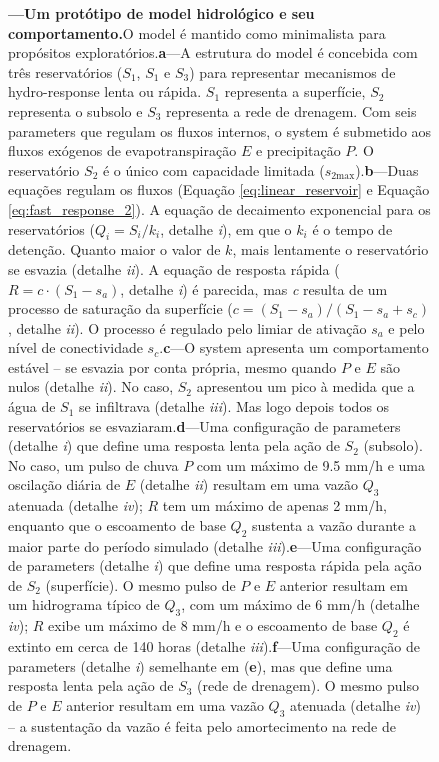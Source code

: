 \documentclass[./main.tex]{subfiles}
\begin{document}
\begin{figure}[t!]
	{\textbf{---\;Um protótipo de \gls{model} hidrológico e seu comportamento.}\;O \gls{model} é mantido como minimalista para propósitos exploratórios.\;\textbf{a}\;---\;A estrutura do \gls{model} é concebida com três reservatórios ($S_1$, $S_1$ e $S_3$) para representar mecanismos de \gls{hydro-response} lenta ou rápida. $S_1$ representa a superfície, $S_2$ representa o subsolo e $S_3$ representa a rede de drenagem. Com seis \gls{parameters} que regulam os fluxos internos, o \gls{system} é submetido aos fluxos exógenos de evapotranspiração $E$ e precipitação $P$. O reservatório $S_2$ é o único com capacidade limitada ($s_\text{2max}$).\;\textbf{b}\;---\;Duas equações regulam os fluxos (Equação \eqref{eq:linear_reservoir} e Equação \eqref{eq:fast_response_2}). A equação de decaimento exponencial para os reservatórios ($Q_i = S_i/k_i$, detalhe \textrm{\textit{i}}), em que o $k_i$ é o tempo de detenção. Quanto maior o valor de $k$, mais lentamente o reservatório se esvazia (detalhe \textrm{\textit{ii}}). A equação de resposta rápida ($R = c\cdot (S_1 - s_a)$, detalhe \textrm{\textit{i}}) é parecida, mas \textit{c} resulta de um processo de saturação da superfície ($c = (S_1 - s_a)/(S_1 - s_a + s_c)$, detalhe \textrm{\textit{ii}}). O processo é regulado pelo limiar de ativação $s_a$ e pelo nível de conectividade $s_c$.\;\textbf{c}\;---\;O \gls{system} apresenta um comportamento estável -- se esvazia por conta própria, mesmo quando $P$ e $E$ são nulos (detalhe \textrm{\textit{ii}}). No caso, $S_2$ apresentou um pico à medida que a água de $S_1$ se infiltrava (detalhe \textrm{\textit{iii}}). Mas logo depois todos os reservatórios se esvaziaram.\;\textbf{d}\;---\;Uma configuração de \gls{parameters} (detalhe \textrm{\textit{i}}) que define uma resposta lenta pela ação de $S_2$ (subsolo). No caso, um pulso de chuva $P$ com um máximo de 9.5 mm/h e uma oscilação diária de $E$ (detalhe \textrm{\textit{ii}}) resultam em uma vazão $Q_3$ atenuada (detalhe \textrm{\textit{iv}}); $R$ tem um máximo de apenas 2 mm/h, enquanto que o escoamento de base $Q_2$ sustenta a vazão durante a maior parte do período simulado (detalhe \textrm{\textit{iii}}).\;\textbf{e}\;---\;Uma configuração de \gls{parameters} (detalhe \textrm{\textit{i}}) que define uma resposta rápida pela ação de $S_2$ (superfície). O mesmo pulso de $P$ e $E$ anterior resultam em um hidrograma típico de $Q_3$, com um máximo de 6 mm/h (detalhe \textrm{\textit{iv}}); $R$ exibe um máximo de 8 mm/h e o escoamento de base $Q_2$ é extinto em cerca de 140 horas (detalhe \textrm{\textit{iii}}).\;\textbf{f}\;---\;Uma configuração de \gls{parameters} (detalhe \textrm{\textit{i}}) semelhante em (\textbf{e}), mas que define uma resposta lenta pela ação de $S_3$ (rede de drenagem). O mesmo pulso de $P$ e $E$ anterior resultam em uma vazão $Q_3$ atenuada (detalhe \textrm{\textit{iv}}) -- a sustentação da vazão é feita pelo amortecimento na rede de drenagem.
	}
\label{fig:sys:proto}  %
\end{figure}
\end{document}
